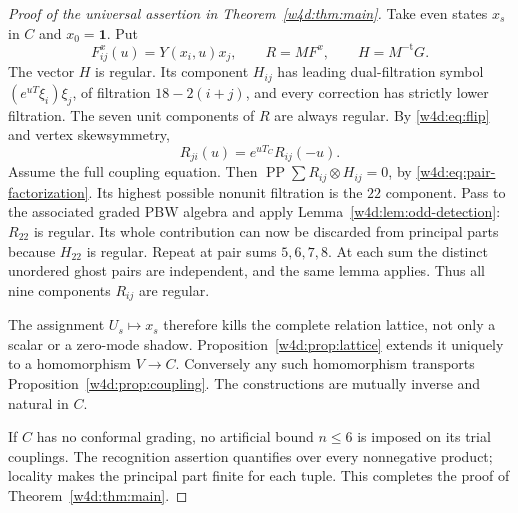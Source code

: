 \begin{proof}[Proof of the universal assertion in Theorem~\ref{w4d:thm:main}]
Take even states $x_s$ in $C$ and $x_0=\mathbf1$. Put
\[
 F^x_{ij}(u)=Y(x_i,u)x_j,\qquad R=MF^x,\qquad H=M^{-\mathrm t}G.
\]
The vector $H$ is regular. Its component $H_{ij}$ has leading dual-filtration symbol
$(e^{uT}\xi_i)\xi_j$, of filtration $18-2(i+j)$, and every correction has strictly lower filtration. The seven unit components of $R$ are always regular. By \eqref{w4d:eq:flip} and vertex skewsymmetry,
\[
 R_{ji}(u)=e^{uT_C}R_{ij}(-u).
\]
Assume the full coupling equation. Then $\operatorname{PP}\sum R_{ij}\otimes H_{ij}=0$, by \eqref{w4d:eq:pair-factorization}. Its highest possible nonunit filtration is the $22$ component. Pass to the associated graded PBW algebra and apply Lemma~\ref{w4d:lem:odd-detection}: $R_{22}$ is regular. Its whole contribution can now be discarded from principal parts because $H_{22}$ is regular. Repeat at pair sums $5,6,7,8$. At each sum the distinct unordered ghost pairs are independent, and the same lemma applies. Thus all nine components $R_{ij}$ are regular.

The assignment $U_s\mapsto x_s$ therefore kills the complete relation lattice, not only a scalar or a zero-mode shadow. Proposition~\ref{w4d:prop:lattice} extends it uniquely to a homomorphism $V\to C$. Conversely any such homomorphism transports Proposition~\ref{w4d:prop:coupling}. The constructions are mutually inverse and natural in $C$.

If $C$ has no conformal grading, no artificial bound $n\leq6$ is imposed on its trial couplings. The recognition assertion quantifies over every nonnegative product; locality makes the principal part finite for each tuple. This completes the proof of Theorem~\ref{w4d:thm:main}.
\end{proof}

